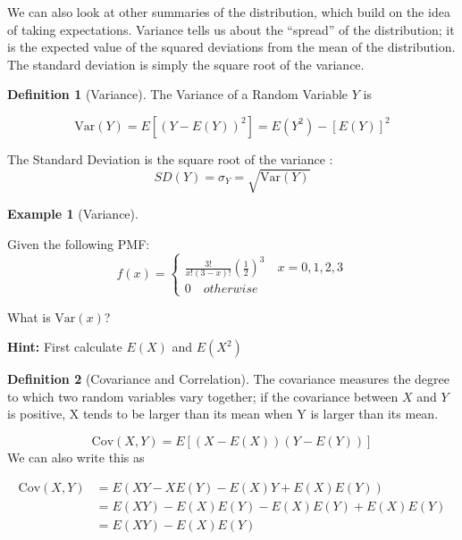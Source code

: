 \documentclass[
]{book}
\theoremstyle{definition}
\newtheorem{definition}{Definition}[chapter]
\theoremstyle{definition}
\newtheorem{example}{Example}[chapter]
\theoremstyle{definition}
\theoremstyle{remark}
\begin{document}
We can also look at other summaries of the distribution, which build on the idea of taking expectations. Variance tells us about the ``spread'' of the distribution; it is the expected value of the squared deviations from the mean of the distribution. The standard deviation is simply the square root of the variance.

\begin{definition}[Variance]
\protect\hypertarget{def:unnamed-chunk-84}{}{\label{def:unnamed-chunk-84} {} }The Variance of a Random Variable \(Y\) is

\[\text{Var}(Y) = E[(Y - E(Y))^2] =  E(Y^2)-[E(Y)]^2\]

The Standard Deviation is the square root of the variance : \[SD(Y) = \sigma_Y= \sqrt{\text{Var}(Y)}\]
\end{definition}

\begin{example}[Variance]
\protect\hypertarget{exm:var}{}{\label{exm:var} {} }

Given the following PMF:
\[f(x) =  \begin{cases}
              \frac{3!}{x!(3-x)!}(\frac{1}{2})^3 \quad x = 0,1,2,3\\
               0 \quad otherwise
            \end{cases}
               \]

What is \(\text{Var}(x)\)?

\textbf{Hint:} First calculate \(E(X)\) and \(E(X^2)\)
\end{example}

\begin{definition}[Covariance and Correlation]
\protect\hypertarget{def:unnamed-chunk-85}{}{\label{def:unnamed-chunk-85} {} }
The covariance measures the degree to which two random variables vary together; if the covariance between \(X\) and \(Y\) is positive, X tends to be larger than its mean when Y is larger than its mean.

\[\text{Cov}(X,Y) = E[(X - E(X))(Y - E(Y))] \]
We can also write this as

\begin{align*}
\text{Cov}(X,Y) &= E\left(XY - XE(Y) - E(X)Y + E(X)E(Y)\right)\\
&= E(XY) - E(X)E(Y) - E(X)E(Y) + E(X)E(Y)\\
&= E(XY) - E(X)E(Y)
\end{align*}
\end{definition}
\end{document}
